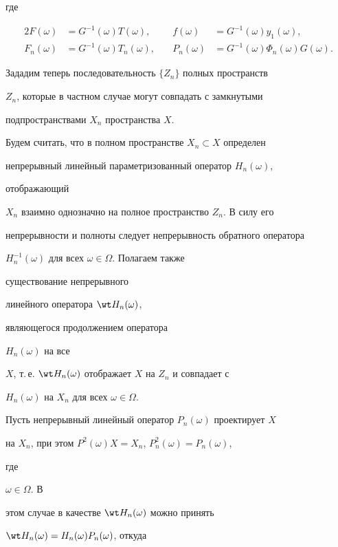 где


\begin{alignat*}{2}


F(\omega)&=G^{-1}(\omega)T(\omega), &\quad


f(\omega)&=G^{-1}(\omega)y_1(\omega), \\


F_n(\omega)&=G^{-1}(\omega)T_n(\omega), &\quad


P_n(\omega)&=G^{-1}(\omega)\Phi_n(\omega)G(\omega).


\end{alignat*}





Зададим теперь последовательность $\{Z_n\}$ полных пространств


$Z_n$, которые в частном случае могут совпадать с замкнутыми


подпространствами $X_n$ пространства $X$.


Будем считать, что в полном пространстве $X_n\subset X$ определен


непрерывный линейный параметризованный оператор $H_n(\omega)$,


отображающий


$X_n$ взаимно однозначно на полное пространство $Z_n$. В силу его


непрерывности и полноты следует непрерывность обратного оператора


$H^{-1}_n(\omega)$ для всех $\omega\in\Omega$. Полагаем также


существование непрерывного


линейного оператора $\wt H_n(\omega)$,


являющегося продолжением оператора


$H_n(\omega)$ на все


$X$, т.\,е. $\wt H_n(\omega)$ отображает $X$ на $Z_n$ и совпадает с


$H_n(\omega)$ на $X_n$ для всех $\omega\in\Omega$.





Пусть непрерывный линейный оператор $P_n(\omega)$ проектирует $X$


на $X_n$, при этом $P^2(\omega)X=X_n$, $P^2_n(\omega)=P_n(\omega)$,


где


$\omega\in\Omega$. В


этом случае в качестве $\wt H_n(\omega)$ можно принять


$\wt H_n(\omega)=H_n(\omega)P_n(\omega)$, откуда


